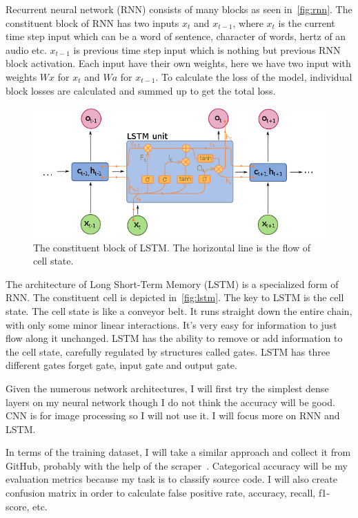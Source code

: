 Recurrent neural network (RNN) consists of many blocks as seen in~\autoref{fig:rnn}.
The constituent block of RNN has two inputs $x_t$ and $x_{t-1}$, where  $x_t$ is the current time step input which can be a word of sentence, character of words, hertz of an audio etc. $x_{t-1}$ is previous time step input which is nothing but previous RNN block activation. Each input have their own weights, here we have two input with weights $Wx$ for $x_t$ and $Wa$ for $x_{t-1}$.
To calculate the loss of the model, individual block losses are calculated and summed up to get the total loss.

\begin{figure}[ht]
\centering
\includegraphics[width=0.7\linewidth]{lstm-big}
\caption{The constituent block of LSTM. The horizontal line is the flow of cell state.}
\label{fig:lstm}
\end{figure}

The architecture of Long Short-Term Memory (LSTM) is a specialized form of RNN. The constituent cell is depicted in~\autoref{fig:lstm}.
The key to LSTM is the cell state.
The cell state is like a conveyor belt. It runs straight down the entire chain, with only some minor linear interactions. It's very easy for information to just flow along it unchanged. LSTM has the ability to remove or add information to the cell state, carefully regulated by structures called gates.
LSTM has three different gates forget gate, input gate and output gate.


Given the numerous network architectures, I will first try the simplest dense layers on my neural network though I do not think the accuracy will be good.
CNN is for image processing so I will not use it.
I will focus more on RNN and LSTM.


In terms of the training dataset, I will take a similar approach and collect it from GitHub, probably with the help of the scraper~\cite{alexandru2017replicating}.
Categorical accuracy will be my evaluation metrics because my task is to classify source code.
I will also create confusion matrix in order to calculate false positive rate, accuracy, recall, f1-score, etc.


